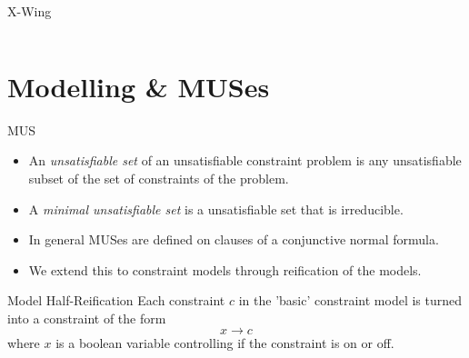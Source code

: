 \documentclass{beamer}
\begin{document}
\begin{frame}{X-Wing}
\begin{columns}
\begin{column}{0.45\textwidth}
\end{column}
\begin{column}{0.45\textwidth}
\begin{itemize}

\end{itemize}
\end{column}
\end{columns}
\end{frame}

\section*{Modelling \& MUSes}
\begin{frame}{MUS}
\begin{itemize}
    \item An \emph{unsatisfiable set} of an unsatisfiable constraint problem is any unsatisfiable subset of the set of constraints of the problem.
    \item A \emph{minimal unsatisfiable set} is a unsatisfiable set that is irreducible.
    \item In general MUSes are defined on clauses of a conjunctive normal formula. 
    \item We extend this to constraint models through reification of the models.
\end{itemize}
\end{frame}

\begin{frame}{Model Half-Reification}
Each constraint $c$ in the 'basic' constraint model is turned into a constraint of the form
\[ 
    x\rightarrow c
\]
where $x$ is a boolean variable controlling if the constraint is on or off.
\end{frame}
\end{document}
